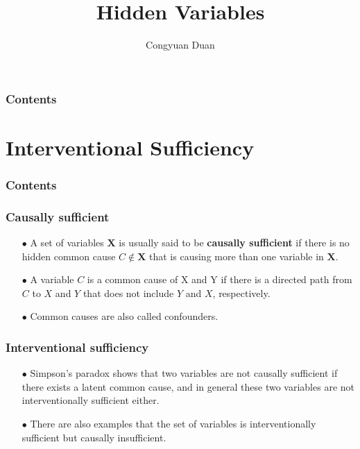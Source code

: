 \documentclass{beamer}
\title{Hidden Variables}
\author{Congyuan Duan}
\begin{document}
\frame{\titlepage}

\begin{frame}
    \frametitle{Contents}
    \tableofcontents
\end{frame}

\section{Interventional Sufficiency}

\begin{frame}
    \frametitle{Contents}
    \tableofcontents[currentsection]
\end{frame}

\begin{frame}
    \frametitle{Causally sufficient}
    \begin{itemize}
        \item[$\bullet$] A set of variables $\textbf{X}$ is usually said to be \textbf{causally sufficient} if there is no hidden
        common cause $C\notin \textbf{X}$ that is causing more than one variable in $\textbf{X}$. 
        \item[$\bullet$] A variable $C$ is a common cause of X and Y if there is a directed path
        from $C$ to $X$ and $Y$ that does not include $Y$ and $X$, respectively.
        \item[$\bullet$] Common causes are also called confounders.
    \end{itemize}
\end{frame}

\begin{frame}
    \frametitle{Interventional sufficiency}
    \begin{itemize} 
        \item[$\bullet$] Simpson's paradox shows that two variables are not causally sufficient if
        there exists a latent common cause, and in general these two variables are not interventionally sufficient either. \\
        \item[$\bullet$] There are also examples that the set of variables is interventionally sufficient but causally insufficient.
    \end{itemize}
\end{frame}
\end{document}
